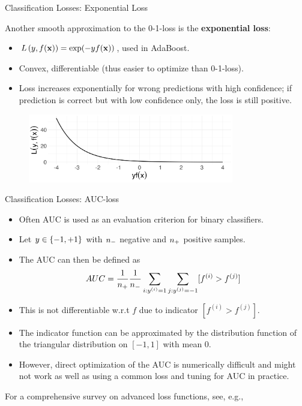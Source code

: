 \documentclass[11pt,compress,t,notes=noshow, xcolor=table]{beamer}
\begin{document}
\begin{vbframe}{Classification Losses: Exponential Loss}

Another smooth 
approximation to the 0-1-loss is the \textbf{exponential loss}:
\begin{itemize}
\item $\Lxy = \exp(-y\fx)$, used in AdaBoost.
\item Convex, differentiable (thus easier to optimize than 0-1-loss).
\item Loss increases exponentially for wrong predictions with high confidence; if prediction is correct but with low confidence only, the loss is still positive.
\end{itemize}


\begin{figure}
\includegraphics[width = 0.8\textwidth]{figure/exponential.png}
\end{figure}

\end{vbframe}

\begin{vbframe}{Classification Losses: AUC-loss}

\begin{itemize}
\item Often AUC is used as an evaluation criterion for binary classifiers.
\item Let $y \in \setmp$ with $\nn$ negative and $\np$ positive samples. %
\item The AUC can then be defined as
$$AUC = \frac{1}{\np} \frac{1}{\nn} \sum_{i: \yi = 1} \sum_{j: \yi[j] = -1} [f^{(i)} > f^{(j)}]$$
\item This is not differentiable w.r.t $f$ due to indicator $[f^{(i)} > f^{(j)}]$.
\item The indicator function can be approximated by the distribution function of the triangular distribution on $[-1, 1]$ with mean $0$.
\item However, direct optimization of the AUC is numerically difficult and might not work as well as using 
a common loss and tuning for AUC in practice.

\end{itemize}

For a comprehensive survey on advanced loss functions, see, e.g., 

\end{vbframe}





\endlecture
\end{document}
